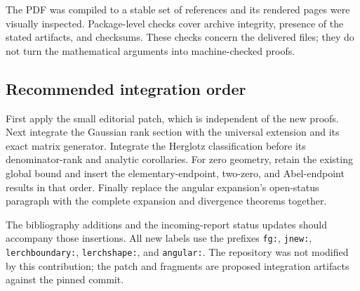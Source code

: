 The PDF was compiled to a stable set of references and its rendered
pages were visually inspected. Package-level checks cover archive
integrity, presence of the stated artifacts, and checksums. These
checks concern the delivered files; they do not turn the mathematical
arguments into machine-checked proofs.

\subsection{Recommended integration order}

First apply the small editorial patch, which is independent of the new
proofs. Next integrate the Gaussian rank section with the universal
extension and its exact matrix generator. Integrate the Herglotz
classification before its denominator-rank and analytic corollaries.
For zero geometry, retain the existing global bound and insert the
elementary-endpoint, two-zero, and Abel-endpoint results in that order.
Finally replace the angular expansion's open-status paragraph with
the complete expansion and divergence theorems together.

The bibliography additions and the incoming-report status updates
should accompany those insertions. All new labels use the prefixes
\texttt{fg:}, \texttt{jnew:}, \texttt{lerchboundary:}, \texttt{lerchshape:}, and
\texttt{angular:}. The repository was not modified by this contribution;
the patch and fragments are proposed integration artifacts against the
pinned commit.
